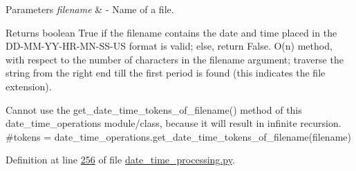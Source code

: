 \begin{DoxyParams}{Parameters}
{\em filename} & -\/ Name of a file. \\
\hline
\end{DoxyParams}
\begin{DoxyReturn}{Returns}
boolean True if the filename contains the date and time placed in the D\+D-\/\+M\+M-\/\+Y\+Y-\/\+H\+R-\/\+M\+N-\/\+S\+S-\/\+U\+S format is valid; else, return False. O(n) method, with respect to the number of characters in the filename argument; traverse the string from the right end till the first period is found (this indicates the file extension). \begin{DoxyVerb}    Cannot use the get_date_time_tokens_of_filename() method
of this date_time_operations module/class, because it
will result in infinite recursion.
    #tokens = date_time_operations.get_date_time_tokens_of_filename(filename)
\end{DoxyVerb}
 
\end{DoxyReturn}


Definition at line \hyperlink{date__time__processing_8py_source_l00256}{256} of file \hyperlink{date__time__processing_8py_source}{date\+\_\+time\+\_\+processing.\+py}.


